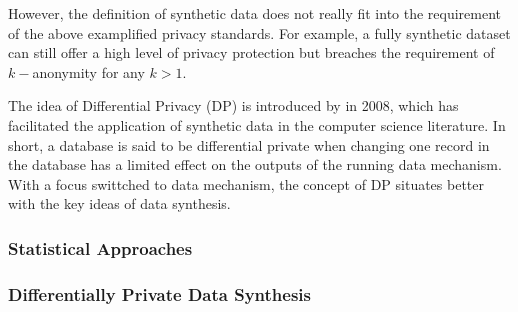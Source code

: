 However, the definition of synthetic data does not really fit into the requirement of the above examplified privacy standards. For example, a fully
synthetic dataset can still offer a high level of privacy protection but breaches the requirement of $k-$anonymity for any $k>1$.

The idea of Differential Privacy (DP) is introduced by \citet{dwork2008differential} in 2008, which has facilitated the application of
synthetic data in the computer science literature. In short, a database is said to be differential private when changing one
record in the database has a limited effect on the outputs of the running data mechanism. With a focus swittched to data mechanism, 
the concept of DP situates better with the key ideas of data synthesis.



\subsubsection{Statistical Approaches}
\label{subsubsec:statsapproach}

\subsubsection{Differentially Private Data Synthesis}
\label{subsubsec:dpds}



